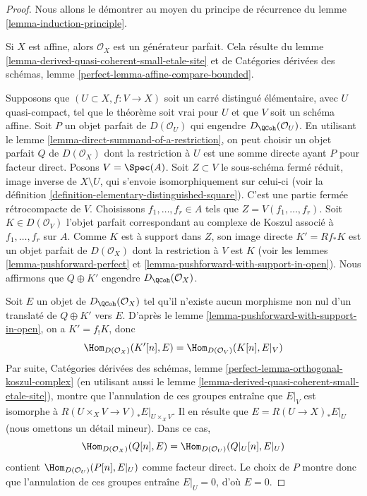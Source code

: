 \begin{proof}
Nous allons le d\'emontrer au moyen du principe de r\'ecurrence du lemme
\ref{lemma-induction-principle}.

\medskip\noindent
Si $X$ est affine, alors $\mathcal{O}_X$ est un g\'en\'erateur parfait. Cela
r\'esulte du lemme \ref{lemma-derived-quasi-coherent-small-etale-site} et de
Cat\'egories d\'eriv\'ees des sch\'emas, lemme
\ref{perfect-lemma-affine-compare-bounded}.

\medskip\noindent
Supposons que $(U\subset X,f:V\to X)$ soit un carr\'e distingu\'e
\'el\'ementaire, avec $U$ quasi-compact, tel que le th\'eor\`eme soit vrai pour
$U$ et que $V$ soit un sch\'ema affine. Soit $P$ un objet parfait de
$D(\mathcal{O}_U)$ qui engendre $D_\QCoh(\mathcal{O}_U)$. En utilisant le
lemme \ref{lemma-direct-summand-of-a-restriction}, on peut choisir un objet
parfait $Q$ de $D(\mathcal{O}_X)$ dont la restriction \`a $U$ est une somme
directe ayant $P$ pour facteur direct. Posons $V=\Spec(A)$. Soit $Z\subset V$
le sous-sch\'ema ferm\'e r\'eduit, image inverse de $X\setminus U$, qui s'envoie
isomorphiquement sur celui-ci (voir la d\'efinition
\ref{definition-elementary-distinguished-square}). C'est une partie ferm\'ee
r\'etrocompacte de $V$. Choisissons $f_1,\ldots,f_r\in A$ tels que
$Z=V(f_1,\ldots,f_r)$. Soit $K\in D(\mathcal{O}_V)$ l'objet parfait
correspondant au complexe de Koszul associ\'e \`a $f_1,\ldots,f_r$ sur $A$.
Comme $K$ est \`a support dans $Z$, son image directe $K'=Rf_*K$ est un objet
parfait de $D(\mathcal{O}_X)$ dont la restriction \`a $V$ est $K$ (voir les
lemmes \ref{lemma-pushforward-perfect} et
\ref{lemma-pushforward-with-support-in-open}). Nous affirmons que
$Q\oplus K'$ engendre $D_\QCoh(\mathcal{O}_X)$.

\medskip\noindent
Soit $E$ un objet de $D_\QCoh(\mathcal{O}_X)$ tel qu'il n'existe aucun
morphisme non nul d'un translat\'e de $Q\oplus K'$ vers $E$. D'apr\`es le lemme
\ref{lemma-pushforward-with-support-in-open}, on a $K'=f_!K$, donc
$$
\Hom_{D(\mathcal{O}_X)}(K'[n], E) = \Hom_{D(\mathcal{O}_V)}(K[n], E|_V)
$$
Par suite, Cat\'egories d\'eriv\'ees des sch\'emas, lemme
\ref{perfect-lemma-orthogonal-koszul-complex} (en utilisant aussi le lemme
\ref{lemma-derived-quasi-coherent-small-etale-site}), montre que l'annulation
de ces groupes entra\^ine que $E|_V$ est isomorphe \`a
$R(U\times_XV\to V)_*E|_{U\times_XV}$. Il en r\'esulte que
$E=R(U\to X)_*E|_U$ (nous omettons un d\'etail mineur). Dans ce cas,
$$
\Hom_{D(\mathcal{O}_X)}(Q[n], E) = \Hom_{D(\mathcal{O}_U)}(Q|_U[n], E|_U)
$$
contient $\Hom_{D(\mathcal{O}_U)}(P[n],E|_U)$ comme facteur direct. Le choix
de $P$ montre donc que l'annulation de ces groupes entra\^ine $E|_U=0$, d'o\`u
$E=0$.
\end{proof}

